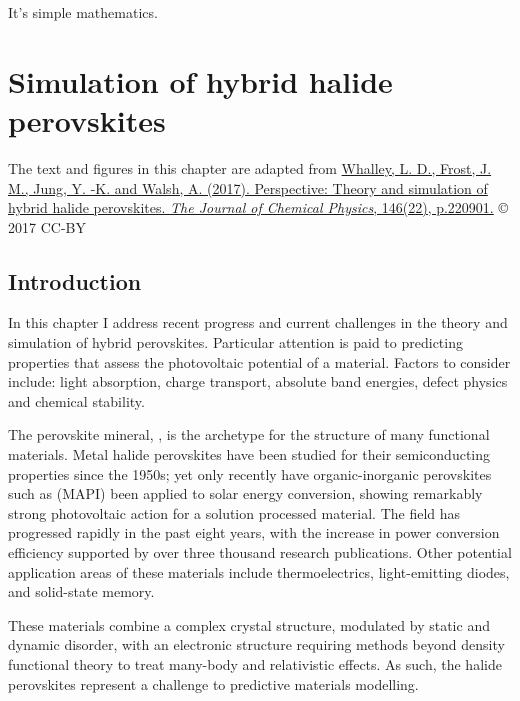 \begin{savequote}[8cm]
It's simple mathematics.
\end{savequote}

\chapter{\label{ch:2-litreview}Simulation of hybrid halide perovskites}

The text and figures in this chapter are adapted from \href{https://doi.org/10.1063/1.4984964}{Whalley, L. D., Frost, J. M., Jung, Y. -K. and Walsh, A. (2017). Perspective: Theory and simulation of hybrid halide perovskites. \textit{The Journal of Chemical Physics}, 146(22), p.220901.} © 2017 CC-BY

\section{Introduction}

In this chapter I address recent progress and current challenges in the theory and simulation of hybrid perovskites. 
Particular attention is paid to predicting properties that assess the photovoltaic potential of a material. 
Factors to consider include: light absorption, charge transport, absolute band energies, defect physics and chemical stability. 

The perovskite mineral, , is the archetype for the structure of many functional materials.\autocite{Schaak2002}
Metal halide perovskites have been studied for their semiconducting properties since the 1950s\autocite{Moller1958}; 
yet only recently have organic-inorganic perovskites such as  (MAPI) been applied to solar energy conversion, showing remarkably strong photovoltaic action for a solution processed material.\autocite{Kojima2009}
The field has progressed rapidly in the past eight years, with the increase in power conversion efficiency supported by over three thousand research publications.\autocite{Stranks2015b,Saparov2016b,Park2016,Walsh2016,Wallace2017}
Other potential application areas of these materials include 
thermoelectrics,\autocite{He2014,Mettan2015}
light-emitting diodes,\autocite{Protesescu2015,Stranks2015b}
and
solid-state memory.\autocite{Yoo2015a,Liu2017}

These materials combine a complex crystal structure, modulated by static and dynamic disorder, with an electronic structure requiring methods beyond density functional theory to treat many-body and relativistic effects. 
As such, the halide perovskites represent a challenge to predictive materials modelling. 

